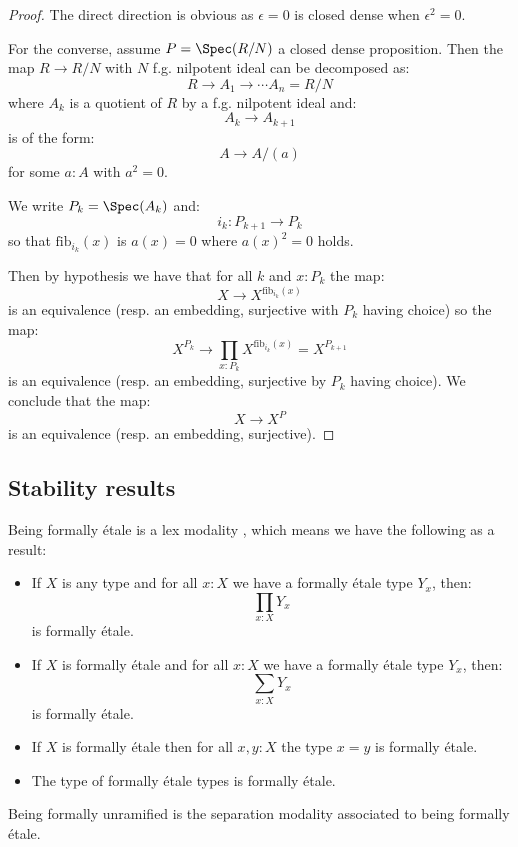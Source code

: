 \begin{proof}
The direct direction is obvious as $\epsilon=0$ is closed dense when $\epsilon^2=0$.

For the converse, assume $P=\Spec(R/N)$ a closed dense proposition. Then the map $R\to R/N$ with $N$ f.g. nilpotent ideal can be decomposed as:
\[R\to A_1\to \cdots A_n = R/N\]
where $A_k$ is a quotient of $R$ by a f.g. nilpotent ideal and:
\[A_k\to A_{k+1}\]
is of the form:
\[A\to A/(a)\]
for some $a:A$ with $a^2=0$.

We write $P_k = \Spec(A_k)$ and:
\[i_k:P_{k+1}\to P_k\] 
so that $\mathrm{fib}_{i_k}(x)$ is $a(x)=0$ where $a(x)^2=0$ holds.

Then by hypothesis we have that for all $k$ and $x:P_{k}$ the map:
\[X\to X^{\mathrm{fib}_{i_k}(x)}\]
is an equivalence (resp. an embedding, surjective with $P_{k}$ having choice) so the map:
\[X^{P_{k}} \to \prod_{x:P_{k}}X^{\mathrm{fib}_{i_k}(x)} = X^{P_{k+1}}\]
is an equivalence (resp. an embedding, surjective by $P_{k}$ having choice). We conclude that the map:
\[X\to X^P\]
is an equivalence (resp. an embedding, surjective).
\end{proof}



\subsection{Stability results}

Being formally étale is a lex modality \cite{TODO modalities in HoTT}, which means we have the following as a result:

\begin{proposition}
\begin{itemize}
\item If $X$ is any type and for all $x:X$ we have a formally étale type $Y_x$, then:
\[\prod_{x:X}Y_x\]
is formally étale. 
\item  If $X$ is formally étale and for all $x:X$ we have a formally étale type $Y_x$, then:
\[\sum_{x:X}Y_x\]
is formally étale. 
\item If $X$ is formally étale then for all $x,y : X$ the type $x=y$ is formally étale.
\item The type of formally étale types is formally étale.
\end{itemize}
\end{proposition}

Being formally unramified is the separation modality \cite{TODO separated modalities} associated to being formally étale.

